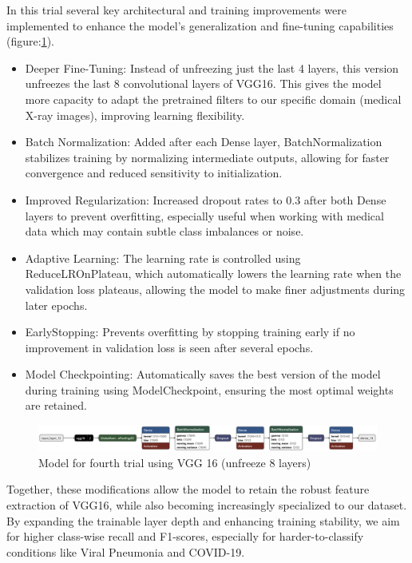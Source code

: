 \documentclass{article}
\begin{document}
In this trial several key architectural and training improvements were implemented to enhance the model's generalization and fine-tuning capabilities (figure:\ref{fig:vgg16result3.png}).
\begin{itemize}
    \item Deeper Fine-Tuning: Instead of unfreezing just the last 4 layers, this version unfreezes the last 8 convolutional layers of VGG16. This gives the model more capacity to adapt the pretrained filters to our specific domain (medical X-ray images), improving learning flexibility.
    \item Batch Normalization: Added after each Dense layer, BatchNormalization stabilizes training by normalizing intermediate outputs, allowing for faster convergence and reduced sensitivity to initialization.
    \item Improved Regularization: Increased dropout rates to 0.3 after both Dense layers to prevent overfitting, especially useful when working with medical data which may contain subtle class imbalances or noise.
    \item Adaptive Learning: The learning rate is controlled using ReduceLROnPlateau, which automatically lowers the learning rate when the validation loss plateaus, allowing the model to make finer adjustments during later epochs.
    \item EarlyStopping: Prevents overfitting by stopping training early if no improvement in validation loss is seen after several epochs.
    \item Model Checkpointing: Automatically saves the best version of the model during training using ModelCheckpoint, ensuring the most optimal weights are retained.
\end{itemize}
\begin{figure}[h!] %
    \centering
    \includegraphics[width=1.0\linewidth]{model_vgg16_fullsize3.keras (1).png}
    \caption{Model for fourth trial using VGG 16 (unfreeze 8 layers)}
    \label{fig:vgg16result3.png}
\end{figure}

Together, these modifications allow the model to retain the robust feature extraction of VGG16, while also becoming increasingly specialized to our dataset. By expanding the trainable layer depth and enhancing training stability, we aim for higher class-wise recall and F1-scores, especially for harder-to-classify conditions like Viral Pneumonia and COVID-19.
\end{document}
